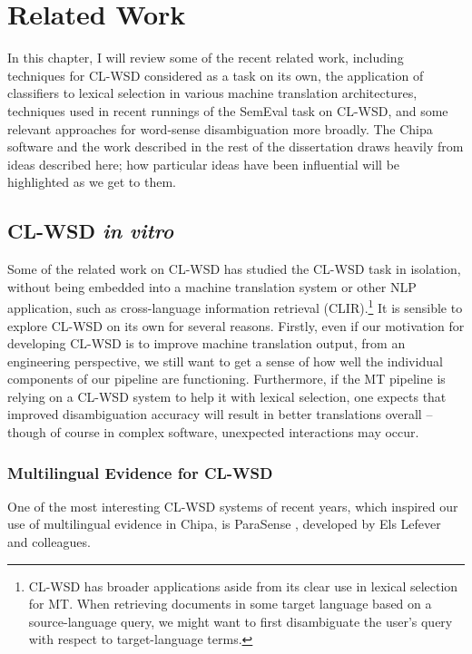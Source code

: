 \chapter{Related Work}
\label{chap:relatedwork}

In this chapter, I will review some of the recent related work, including
techniques for CL-WSD considered as a task on its own, the application of
classifiers to lexical selection in various machine translation architectures,
techniques used in recent runnings of the SemEval task on CL-WSD, and some
relevant approaches for word-sense disambiguation more broadly. The Chipa
software and the work described in the rest of the dissertation draws heavily
from ideas described here; how particular ideas have been influential will be
highlighted as we get to them.

\section{CL-WSD \emph{in vitro}}
Some of the related work on CL-WSD has studied the CL-WSD task in isolation, 
without being embedded into a machine translation system or other NLP
application, such as cross-language information retrieval (CLIR).\footnote{
CL-WSD has broader applications aside from its clear use in lexical selection
for MT. When retrieving documents in some target language based on a
source-language query, we might want to first disambiguate the user's query
with respect to target-language terms.}
It is sensible to explore CL-WSD on its own for several reasons. Firstly, even
if our motivation for developing CL-WSD is to improve machine translation
output, from an engineering perspective, we still want to get a sense of
how well the individual components of our pipeline are functioning.
Furthermore, if the MT pipeline is relying on a CL-WSD system to help it with
lexical selection, one expects that improved disambiguation accuracy will
result in better translations overall -- though of course in complex software,
unexpected interactions may occur.

\subsection{Multilingual Evidence for CL-WSD}
One of the most interesting CL-WSD systems of recent years, which inspired our
use of multilingual evidence in Chipa, is ParaSense
\cite{lefever-hoste-decock:2011:ACL-HLT2011}, developed by Els Lefever and
colleagues.

